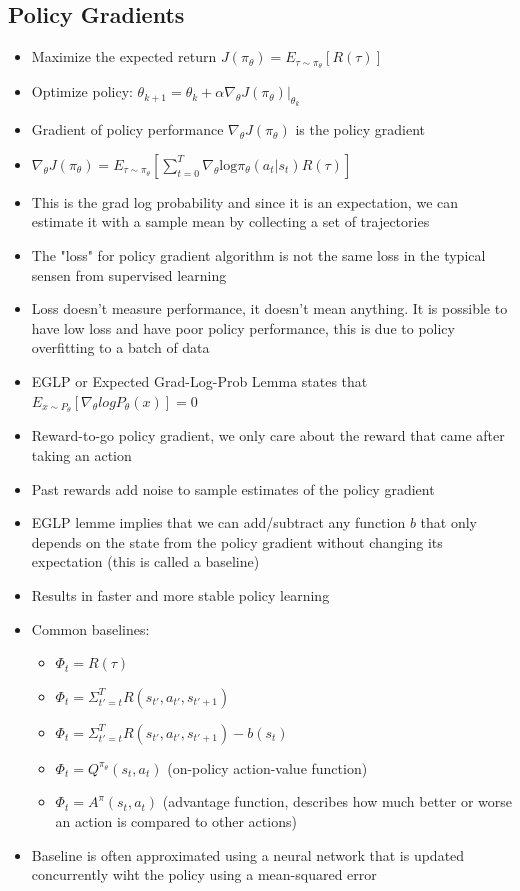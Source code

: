 \documentclass[../main.tex]{subfiles}
\begin{document}
  \subsection{Policy Gradients}
    \begin{itemize}
      \item Maximize the expected return $J(\pi_{\theta}) = E_{\tau \sim \pi_{\theta}}[R(\tau)]$
      \item Optimize policy: $\theta_{k+1} = \theta_{k} + \alpha \nabla_{\theta}J(\pi_{\theta})|_{\theta_{k}}$
      \item Gradient of policy performance $\nabla_{\theta}J(\pi_{\theta})$ is the policy gradient
      \item $\nabla_{\theta}J(\pi_{\theta}) = E_{\tau \sim \pi_{\theta}}[\sum_{t=0}^{T} \nabla_{\theta} \text{log} \pi_{\theta}(a_{t}|s_{t})R(\tau)]$
      \item This is the grad log probability and since it is an expectation, we can estimate it with a sample mean by collecting a set of trajectories
      \item The "loss" for policy gradient algorithm is not the same loss in the typical sensen from supervised learning
      \item Loss doesn't measure performance, it doesn't mean anything. It is possible to have low loss and have poor policy performance, this is due to policy overfitting to a batch of data
      \item EGLP or Expected Grad-Log-Prob Lemma states that $E_{x \sim P_{\theta}}[\nabla_{\theta} log P_{\theta}(x)] = 0$
      \item Reward-to-go policy gradient, we only care about the reward that came after taking an action
      \item Past rewards add noise to sample estimates of the policy gradient
      \item EGLP lemme implies that we can add/subtract any function $b$ that only depends on the state from the policy gradient without changing its expectation (this is called a baseline)
      \item Results in faster and more stable policy learning
      \item Common baselines:
      \begin{itemize}
        \item $\Phi_{t} = R(\tau)$
        \item $\Phi_{t} = \Sigma_{t'=t}^{T}R(s_{t'}, a_{t'}, s_{t'+1})$
        \item $\Phi_{t} = \Sigma_{t'=t}^{T}R(s_{t'}, a_{t'}, s_{t'+1}) - b(s_{t})$
        \item $\Phi_{t} = Q^{\pi_{\theta}}(s_{t}, a_{t})$ (on-policy action-value function)
        \item $\Phi_{t} = A^{\pi}(s_{t}, a_{t})$ (advantage function, describes how much better or worse an action is compared to other actions)
      \end{itemize}
      \item Baseline is often approximated using a neural network that is updated concurrently wiht the policy using a mean-squared error

    \end{itemize}
\end{document}
